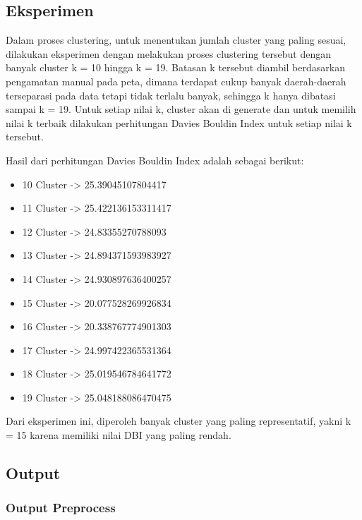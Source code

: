 \documentclass{article}
\begin{document}
\subsection{Eksperimen}

\begin{adjustwidth}{2em}{0pt}
	
\hspace{\parindent}Dalam proses clustering, untuk menentukan jumlah cluster yang paling sesuai, dilakukan eksperimen dengan melakukan proses clustering tersebut dengan banyak cluster k = 10 hingga k = 19. Batasan k tersebut diambil berdasarkan pengamatan manual pada peta, dimana terdapat cukup banyak daerah-daerah terseparasi pada data tetapi tidak terlalu banyak, sehingga k hanya dibatasi sampai k = 19. Untuk setiap nilai k, cluster akan di generate dan untuk memilih nilai k terbaik dilakukan perhitungan Davies Bouldin Index untuk setiap nilai k tersebut.

Hasil dari perhitungan Davies Bouldin Index adalah sebagai berikut: 

\begin{itemize}
	\item{10 Cluster -> 25.39045107804417}
	\item{11 Cluster -> 25.422136153311417}
	\item{12 Cluster -> 24.83355270788093}
	\item{13 Cluster -> 24.894371593983927}
	\item{14 Cluster -> 24.930897636400257}
	\item{15 Cluster -> 20.077528269926834}
	\item{16 Cluster -> 20.338767774901303}
	\item{17 Cluster -> 24.997422365531364}
	\item{18 Cluster -> 25.019546784641772}
	\item{19 Cluster -> 25.048188086470475}	
\end{itemize}

Dari eksperimen ini, diperoleh banyak cluster yang paling representatif, yakni k = 15 karena memiliki nilai DBI yang paling rendah.

\end{adjustwidth}

\subsection{Output}

\subsubsection{Output Preprocess}
\end{document}
